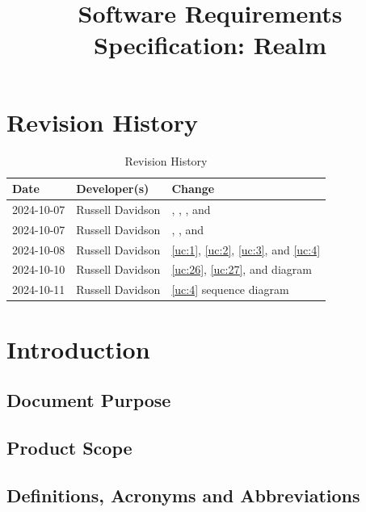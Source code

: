 \documentclass{article}
\title{Software Requirements Specification: Realm\\\progname}
\author{\authname}
\date{}
\begin{document}
\maketitle

\newpage{}

\tableofcontents

\section*{Revision History}

\begin{table}[hp]
\caption{Revision History} \label{TblRevisionHistory}
\begin{tabularx}{\textwidth}{llX}
\toprule
\textbf{Date} & \textbf{Developer(s)} & \textbf{Change}\\
\midrule
2024-10-07 & Russell Davidson & \nameref{sub:compliance}, \nameref{ssub:installation}, \nameref{ssub:distribution}, and \nameref{ssub:portability} \\
2024-10-07 & Russell Davidson & \nameref{ssub:tutorial}, \nameref{ssub:tour_management}, and \nameref{ssub:touring} \\
2024-10-08 & Russell Davidson & \ref{uc:1}, \ref{uc:2}, \ref{uc:3}, and \ref{uc:4} \\
2024-10-10 & Russell Davidson & \ref{uc:26}, \ref{uc:27}, and \nameref{sub:use_cases} diagram\\
2024-10-11 & Russell Davidson & \ref{uc:4} sequence diagram\\
\bottomrule
\end{tabularx}
\end{table}

\section{Introduction}


\subsection{Document Purpose}


\subsection{Product Scope}


\subsection{Definitions, Acronyms and Abbreviations}
\label{sub:def_acr_abb}
\end{document}
